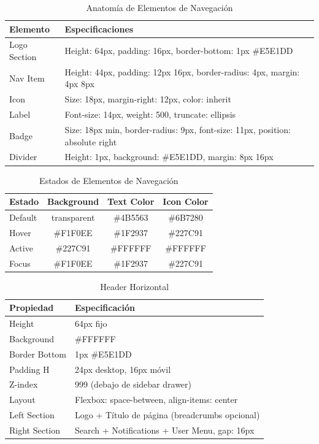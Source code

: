 \documentclass[12pt,a4paper,oneside]{article}
\begin{document}
\begin{table}[h]
\centering
\caption{Anatomía de Elementos de Navegación}
\label{tab:nav-items}
\small
\begin{tabular}{|l|p{8cm}|}
\hline
\textbf{Elemento} & \textbf{Especificaciones} \\
\hline
Logo Section & Height: 64px, padding: 16px, border-bottom: 1px \#E5E1DD \\
\hline
Nav Item & Height: 44px, padding: 12px 16px, border-radius: 4px, margin: 4px 8px \\
\hline
Icon & Size: 18px, margin-right: 12px, color: inherit \\
\hline
Label & Font-size: 14px, weight: 500, truncate: ellipsis \\
\hline
Badge & Size: 18px min, border-radius: 9px, font-size: 11px, position: absolute right \\
\hline
Divider & Height: 1px, background: \#E5E1DD, margin: 8px 16px \\
\hline
\end{tabular}
\end{table}

\begin{table}[h]
\centering
\caption{Estados de Elementos de Navegación}
\label{tab:nav-estados}
\small
\begin{tabular}{|l|c|c|c|}
\hline
\textbf{Estado} & \textbf{Background} & \textbf{Text Color} & \textbf{Icon Color} \\
\hline
Default & transparent & \#4B5563 & \#6B7280 \\
\hline
Hover & \#F1F0EE & \#1F2937 & \#227C91 \\
\hline
Active & \#227C91 & \#FFFFFF & \#FFFFFF \\
\hline
Focus & \#F1F0EE & \#1F2937 & \#227C91 \\
\hline
\end{tabular}
\end{table}

\begin{table}[h]
\centering
\caption{Header Horizontal}
\label{tab:header-specs}
\small
\begin{tabular}{|l|p{9cm}|}
\hline
\textbf{Propiedad} & \textbf{Especificación} \\
\hline
Height & 64px fijo \\
\hline
Background & \#FFFFFF \\
\hline
Border Bottom & 1px \#E5E1DD \\
\hline
Padding H & 24px desktop, 16px móvil \\
\hline
Z-index & 999 (debajo de sidebar drawer) \\
\hline
Layout & Flexbox: space-between, align-items: center \\
\hline
Left Section & Logo + Título de página (breadcrumbs opcional) \\
\hline
Right Section & Search + Notifications + User Menu, gap: 16px \\
\hline
\end{tabular}
\end{table}
\end{document}
